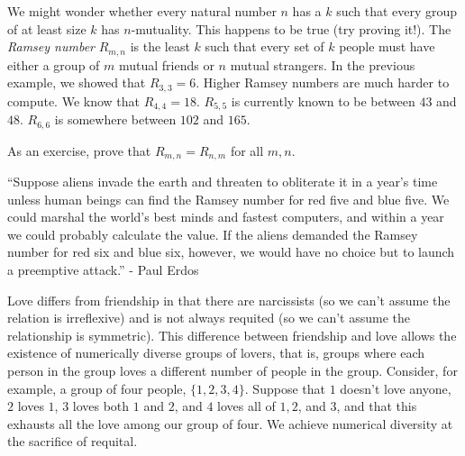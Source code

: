 \begin{aside}
We might wonder whether every natural number $n$ has a $k$ such that every group of at least size $k$ has $n$-mutuality. This happens to be true (try proving it!). The \emph{Ramsey number} $R_{m, n}$ is the least $k$ such that every set of $k$ people must have either a group of $m$ mutual friends or $n$ mutual strangers. In the previous example, we showed that $R_{3, 3} = 6$. Higher Ramsey numbers are much harder to compute. We know that $R_{4, 4} = 18$. $R_{5, 5}$ is currently known to be between $43$ and $48$. $R_{6, 6}$ is somewhere between $102$ and $165$. 

As an exercise, prove that $R_{m, n} = R_{n, m}$ for all $m, n$.

``Suppose aliens invade the earth and threaten to obliterate it in a year's time unless human beings can find the Ramsey number for red five and blue five. We could marshal the world's best minds and fastest computers, and within a year we could probably calculate the value. If the aliens demanded the Ramsey number for red six and blue six, however, we would have no choice but to launch a preemptive attack.'' - Paul Erdos
\end{aside}

Love differs from friendship in that there are narcissists (so we can't assume the relation is irreflexive) and is not always requited (so we can't assume the relationship is symmetric). This difference between friendship and love allows the existence of numerically diverse groups of lovers, that is, groups where each person in the group loves a different number of people in the group. Consider, for example, a group of four people, $\{1, 2, 3, 4\}$. Suppose that $1$ doesn't love anyone, $2$ loves $1$, $3$ loves both $1$ and $2$, and $4$ loves all of $1,2$, and $3$, and that this exhausts all the love among our group of four. We achieve numerical diversity at the sacrifice of requital. 

\begin{center}
\end{center}

